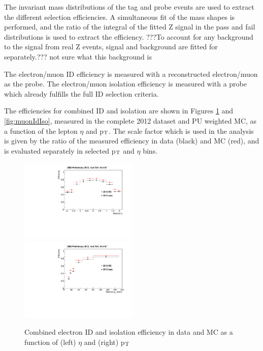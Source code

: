 The invariant mass distributions of the tag and probe events are used to extract
the different
selection efficiencies. A simultaneous fit of the mass shapes is performed, and
the ratio of the integral of the fitted Z signal in the pass and fail
distributions is used to extract the efficiency. ???To account for any background
to the signal from real Z events, signal and background are fitted for
separately.??? not sure what this background is

The electron/muon ID efficiency is measured with a reconstructed
electron/muon as the probe. The electron/muon isolation efficiency is measured
with a probe which already fulfills the full ID selection criteria. 

The efficiencies for combined ID and isolation are shown in Figures
\ref{fig:electronIdIso} and \ref{fig:muonIdIso}, measured in the complete 2012
dataset and PU weighted MC, as a function of the lepton $\eta$ and p$_{\rm{T}}$.
The scale factor which is used in the analysis is given by the ratio of the
measured efficiency in data (black) and MC (red), and is evaluated separately in
selected p$_{\rm{T}}$ and $\eta$ bins.

\begin{figure}[h!]
\includegraphics[width=0.5\textwidth]{plots/TagAndProbe/ElectronIdIsoEta2012DatavsMC.pdf}
\includegraphics[width=0.5\textwidth]{plots/TagAndProbe/ElectronIdIsoPT2012DatavsMC.pdf}
\caption{Combined electron ID and isolation efficiency in data and MC as a
function of (left) $\eta$ and (right) p$_{\rm{T}}$}
\label{fig:electronIdIso}
\end{figure}

